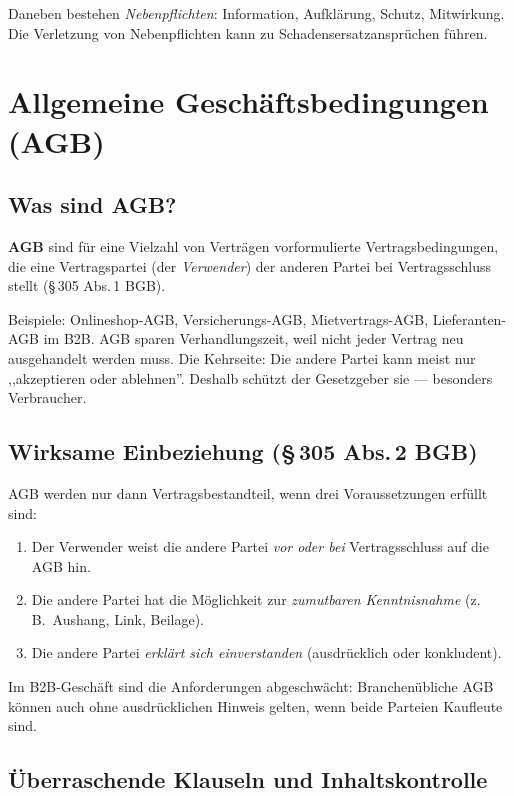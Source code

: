 \documentclass[11pt, a4paper]{article}
\begin{document}
Daneben bestehen \emph{Nebenpflichten}: Information, Aufklärung, Schutz, Mitwirkung.
Die Verletzung von Nebenpflichten kann zu Schadensersatzansprüchen führen.

\section{Allgemeine Geschäftsbedingungen (AGB)}

\subsection{Was sind AGB?}

\begin{merksatz}
\textbf{AGB} sind für eine Vielzahl von Verträgen vorformulierte Vertrags­bedingungen,
die eine Vertragspartei (der \emph{Verwender}) der anderen Partei bei Vertragsschluss
stellt (§\,305 Abs.\,1 BGB).
\end{merksatz}

Beispiele: Onlineshop-AGB, Versicherungs-AGB, Mietvertrags-AGB, Lieferanten-AGB im B2B.
AGB sparen Verhandlungs­zeit, weil nicht jeder Vertrag neu ausgehandelt werden muss.
Die Kehrseite: Die andere Partei kann meist nur ,,akzeptieren oder ablehnen''.
Deshalb schützt der Gesetzgeber sie --- besonders Verbraucher.

\subsection{Wirksame Einbeziehung (§\,305 Abs.\,2 BGB)}

AGB werden nur dann Vertragsbestandteil, wenn drei Voraussetzungen erfüllt sind:

\begin{enumerate}
  \item Der Verwender weist die andere Partei \emph{vor oder bei} Vertragsschluss auf die AGB hin.
  \item Die andere Partei hat die Möglichkeit zur \emph{zumutbaren Kenntnisnahme} (z.\,B.\ Aushang, Link, Beilage).
  \item Die andere Partei \emph{erklärt sich einverstanden} (ausdrücklich oder konkludent).
\end{enumerate}

Im B2B-Geschäft sind die Anforderungen abgeschwächt: Branchen­übliche AGB können auch
ohne ausdrücklichen Hinweis gelten, wenn beide Parteien Kaufleute sind.

\subsection{Überraschende Klauseln und Inhaltskontrolle}
\end{document}

